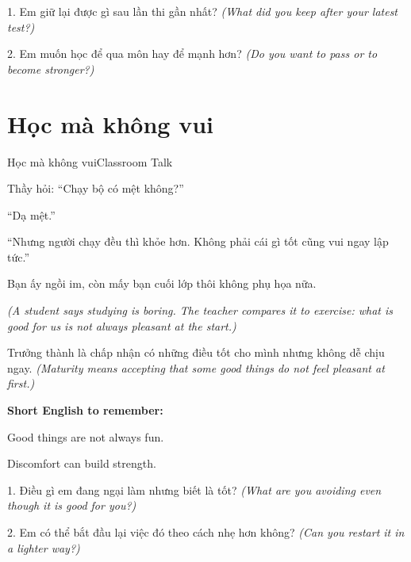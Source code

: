 \begin{tuhocnhanh}
1. Em giữ lại được gì sau lần thi gần nhất? \textit{(What did you keep after your latest test?)}

2. Em muốn học để qua môn hay để mạnh hơn? \textit{(Do you want to pass or to become stronger?)}
\end{tuhocnhanh}
\ngancach

\section{Học mà không vui}
\begin{truyen}{Học mà không vui}{Classroom Talk}

Thầy hỏi: ``Chạy bộ có mệt không?''

``Dạ mệt.''

``Nhưng người chạy đều thì khỏe hơn. Không phải cái gì tốt cũng vui ngay lập tức.''

Bạn ấy ngồi im, còn mấy bạn cuối lớp thôi không phụ họa nữa.

\textit{(A student says studying is boring. The teacher compares it to exercise: what is good for us is not always pleasant at the start.)}
\end{truyen}

\begin{baihoc}
Trưởng thành là chấp nhận có những điều tốt cho mình nhưng không dễ chịu ngay.
\textit{(Maturity means accepting that some good things do not feel pleasant at first.)}
\end{baihoc}

\begin{ghinhoanh}
\textbf{Short English to remember:}

Good things are not always fun.

Discomfort can build strength.
\end{ghinhoanh}

\begin{tuhocnhanh}
1. Điều gì em đang ngại làm nhưng biết là tốt? \textit{(What are you avoiding even though it is good for you?)}

2. Em có thể bắt đầu lại việc đó theo cách nhẹ hơn không? \textit{(Can you restart it in a lighter way?)}
\end{tuhocnhanh}
\ngancach

